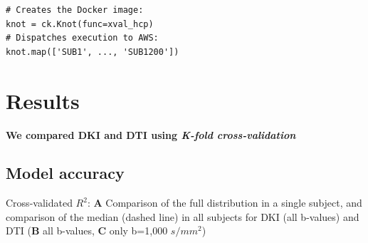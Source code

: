 \documentclass[a0, landscape]{a0poster}
\begin{document}
\begin{multicols}{3}
\begin{minipage}[b]{1\linewidth}
\begin{minipage}[b]{0.55\linewidth}
\begin{lstlisting}
# Creates the Docker image:
knot = ck.Knot(func=xval_hcp)
# Dispatches execution to AWS:
knot.map(['SUB1', ..., 'SUB1200'])
\end{lstlisting}
\end{minipage}
\end{minipage}

\columnbreak

\section*{Results}

\noindent \textbf{We compared DKI and DTI using \emph{K-fold cross-validation}}

\subsection*{Model accuracy}
\normalsize

\noindent Cross-validated $R^2$: \textbf{A} Comparison of the full distribution
in a single subject, and comparison of the median (dashed line) in all subjects
for DKI (all b-values) and DTI (\textbf{B} all b-values, \textbf{C} only b=1,000
$s/mm^2$)  \hfill \break


\end{multicols}
\end{document}
